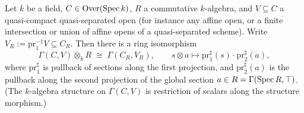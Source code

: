 \begin{theorem}
  \label{pa-thm:sectionsBaseChange}
  \leanok

  Let \(k\) be a field, \(C \in \mathrm{Over}(\operatorname{Spec} k)\), \(R\) a commutative \(k\)-algebra, and
  \(V \subseteq C\) a quasi-compact quasi-separated open (for instance any affine open,
  or a finite intersection or union of affine opens of a quasi-separated scheme). Write
  \(V_R := \mathrm{pr}_1^{-1} V \subseteq C_R\). Then there is a ring isomorphism
  \[
    \Gamma(C, V) \otimes_k R \;\cong\; \Gamma(C_R, V_R), \qquad
    s \otimes a \longmapsto \mathrm{pr}_1^{\sharp}(s) \cdot \mathrm{pr}_2^{\sharp}(a),
  \]
  where \(\mathrm{pr}_1^{\sharp}\) is pullback of sections along the first projection,
  and \(\mathrm{pr}_2^{\sharp}(a)\) is the pullback along the second projection of the
  global section \(a \in R = \Gamma(\operatorname{Spec} R, \top)\). (The \(k\)-algebra structure on
  \(\Gamma(C, V)\) is restriction of scalars along the structure morphism.)
\end{theorem}
